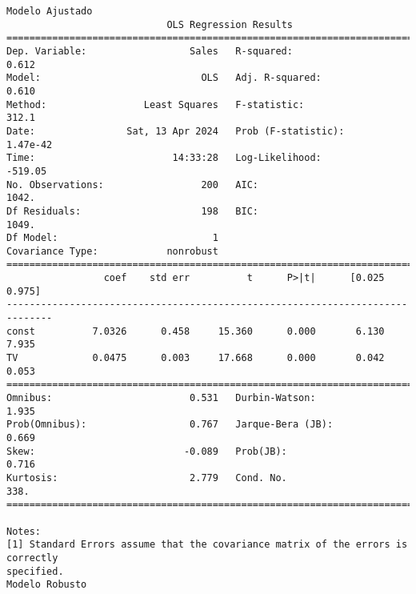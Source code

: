 \documentclass[11pt]{article}
\newcommand{\prompt}[4]{
        {\ttfamily\llap{{\color{#2}[#3]:\hspace{3pt}#4}}\vspace{-\baselineskip}}
    }
\begin{document}
    \begin{Verbatim}[commandchars=\\\{\}]
Modelo Ajustado
                            OLS Regression Results
==============================================================================
Dep. Variable:                  Sales   R-squared:                       0.612
Model:                            OLS   Adj. R-squared:                  0.610
Method:                 Least Squares   F-statistic:                     312.1
Date:                Sat, 13 Apr 2024   Prob (F-statistic):           1.47e-42
Time:                        14:33:28   Log-Likelihood:                -519.05
No. Observations:                 200   AIC:                             1042.
Df Residuals:                     198   BIC:                             1049.
Df Model:                           1
Covariance Type:            nonrobust
==============================================================================
                 coef    std err          t      P>|t|      [0.025      0.975]
------------------------------------------------------------------------------
const          7.0326      0.458     15.360      0.000       6.130       7.935
TV             0.0475      0.003     17.668      0.000       0.042       0.053
==============================================================================
Omnibus:                        0.531   Durbin-Watson:                   1.935
Prob(Omnibus):                  0.767   Jarque-Bera (JB):                0.669
Skew:                          -0.089   Prob(JB):                        0.716
Kurtosis:                       2.779   Cond. No.                         338.
==============================================================================

Notes:
[1] Standard Errors assume that the covariance matrix of the errors is correctly
specified.
Modelo Robusto
    \end{Verbatim}
 
            
\prompt{Out}{outcolor}{32}{}
    
\end{document}
